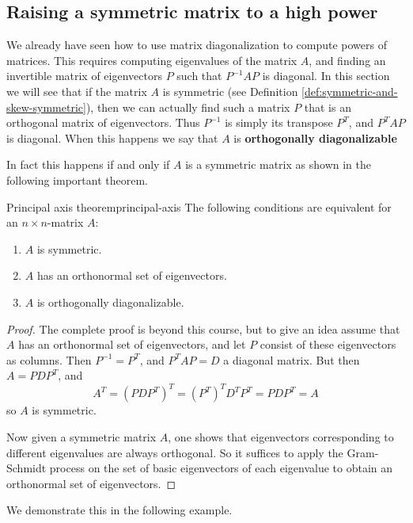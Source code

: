 \subsection{Raising a symmetric matrix to a high power}

We already have seen how to use matrix diagonalization to compute
powers of matrices. This requires computing eigenvalues of the matrix
$A$, and finding an invertible matrix of eigenvectors $P$ such that
$P^{-1}AP$ is diagonal. In this section we will see that if the matrix
$A$ is symmetric (see Definition \ref{def:symmetric-and-skew-symmetric}),
then we can actually find such a matrix $P$ that is an orthogonal
matrix of eigenvectors. Thus $P^{-1}$ is simply its transpose
$P^T$, and $P^TAP$ is diagonal. When this happens we say that $A$ is
\textbf{orthogonally diagonalizable}

In fact this happens if and only if $A$ is a symmetric matrix as
shown in the following important theorem.

\begin{theorem}{Principal axis theorem}{principal-axis}
The following conditions are equivalent for an $n \times n$-matrix $A$:
\begin{enumerate}
\item $A$ is symmetric. 
\item $A$ has an orthonormal set of eigenvectors. 
\item $A$ is  orthogonally diagonalizable.
\end{enumerate}
\end{theorem}

\begin{proof}
The complete proof is beyond this course, but to give an idea assume
that $A$ has an orthonormal set of eigenvectors, and let $P$ consist
of these eigenvectors as columns. Then $P^{-1}=P^T$, and $P^TAP=D$ a diagonal matrix. But then $A=PDP^T$, and
\[ A^T=(PDP^T)^T = (P^T)^TD^TP^T=PDP^T=A\]
so $A$ is symmetric. 

Now given a symmetric matrix $A$, one shows that eigenvectors
corresponding to different eigenvalues are always orthogonal. So it
suffices to apply the Gram-Schmidt process on the set of basic
eigenvectors of each eigenvalue to obtain an orthonormal set of eigenvectors. 
\end{proof}

We demonstrate this in the following example. 

